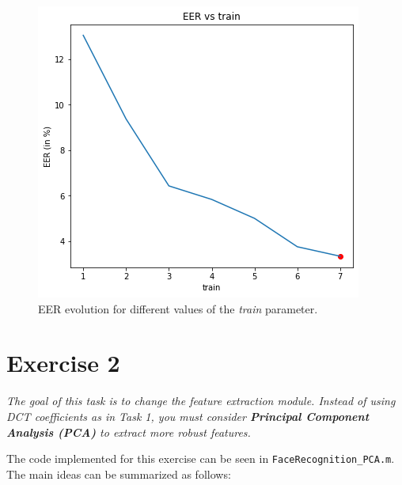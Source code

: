 \documentclass[11pt]{article}
\begin{document}
\begin{figure}[h!]
  \centering
    \includegraphics[scale=0.55]{img/1d_eer_evol}
    \caption{EER evolution for different values of the \textit{train} parameter.}
    \label{fig:ex1d_bis}
\end{figure}

\section*{Exercise 2}

\textit{The goal of this task is to change the feature extraction module. Instead of using DCT coefficients as in Task 1, you must consider \textbf{Principal Component Analysis (PCA)} to extract more robust features.}

The code implemented for this exercise can be seen in \verb|FaceRecognition_PCA.m|. The main ideas can be summarized as follows:
\end{document}
